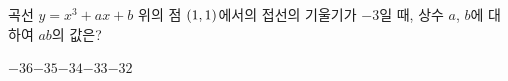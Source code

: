 곡선 $y=x^3+ax+b$ 위의 점 $(1{,}\mkern3mu\mathopen{}1)$에서의 접선의 기울기가 $-3$일 때, 상수 $a$, $b$에 대하여 $ab$의 값은?
\begin{choices32}{$-36$}{$-35$}{$-34$}{$-33$}{$-32$}\end{choices32}
